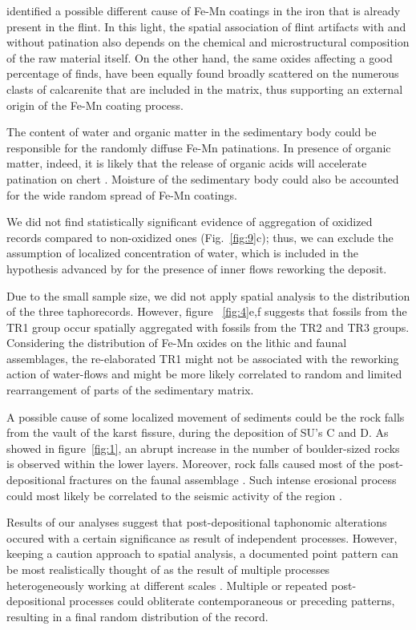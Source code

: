 \documentclass[review,authoryear]{elsarticle} %
\begin{document}
\citet{Rottlander1975} identified a possible different cause of Fe-Mn coatings in the iron that is already present in the flint. In this light, the spatial association of flint artifacts with and without patination also depends on the chemical and microstructural composition of the raw material itself. On the other hand, the same oxides affecting a good percentage of finds, have been equally found broadly scattered on the numerous clasts of calcarenite that are included in the matrix, thus supporting an external origin of the Fe-Mn coating process.

The content of water and organic matter in the sedimentary body could be responsible for the randomly diffuse Fe-Mn patinations. In presence of organic matter, indeed, it is likely that the release of organic acids will accelerate patination on chert \citep{Burroni2002}. Moisture of the sedimentary body could also be accounted for the wide random spread of Fe-Mn coatings.

We did not find statistically significant evidence of aggregation of oxidized records compared to non-oxidized ones (Fig.~\ref{fig:9}c); thus, we can exclude the assumption of localized concentration of water, which is included in the hypothesis advanced by \citet{Bagnus2011} for the presence of inner flows reworking the deposit.

Due to the small sample size, we did not apply spatial analysis to the distribution of the three taphorecords. However, figure ~\ref{fig:4}e,f suggests that fossils from the TR1 group occur spatially aggregated with fossils from the TR2 and TR3 groups. Considering the distribution of Fe-Mn oxides on the lithic and faunal assemblages, the re-elaborated TR1 \citep[\emph{sensu}][]{Fernandez-Lopez1991,Fernandez-Lopez2007,Fernandez-Lopez2011} might not be associated with the reworking action of water-flows and might be more likely correlated to random and limited rearrangement of parts of the sedimentary matrix.

A possible cause of some localized movement of sediments could be the rock falls from the vault of the karst fissure, during the deposition of SU's C and D. As showed in figure~\ref{fig:1}, an abrupt increase in the number of boulder-sized rocks is observed within the lower layers. Moreover, rock falls caused most of the post-depositional fractures on the faunal assemblage \citep{Bagnus2011}. Such intense erosional process could most likely be correlated to the seismic activity of the region \citep{Bertok2013}.

Results of our analyses suggest that post-depositional taphonomic alterations occured with a certain significance as result of independent processes. However, keeping a caution approach to spatial analysis, a documented point pattern can be most realistically thought of as the result of multiple processes heterogeneously working at different scales \citep{Bevan2013}. Multiple or repeated post-depositional processes could obliterate contemporaneous or preceding patterns, resulting in a final random distribution of the record.
\end{document}
